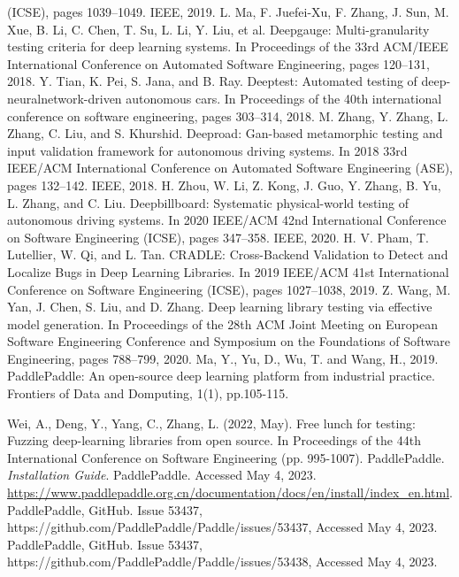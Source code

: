 \documentclass[sigconf]{acmart}
\begin{document}
\begin{thebibliography}{9}
(ICSE), pages 1039–1049. IEEE, 2019.
 L. Ma, F. Juefei-Xu, F. Zhang, J. Sun, M. Xue, B. Li, C. Chen, T. Su, L. Li, Y. Liu,
et al. Deepgauge: Multi-granularity testing criteria for deep learning systems. In
Proceedings of the 33rd ACM/IEEE International Conference on Automated Software
Engineering, pages 120–131, 2018.
 Y. Tian, K. Pei, S. Jana, and B. Ray. Deeptest: Automated testing of deep-neuralnetwork-driven autonomous cars. In Proceedings of the 40th international conference on software engineering, pages 303–314, 2018.
 M. Zhang, Y. Zhang, L. Zhang, C. Liu, and S. Khurshid. Deeproad: Gan-based
metamorphic testing and input validation framework for autonomous driving
systems. In 2018 33rd IEEE/ACM International Conference on Automated Software
Engineering (ASE), pages 132–142. IEEE, 2018.
 H. Zhou, W. Li, Z. Kong, J. Guo, Y. Zhang, B. Yu, L. Zhang, and C. Liu. Deepbillboard: Systematic physical-world testing of autonomous driving systems. In 2020
IEEE/ACM 42nd International Conference on Software Engineering (ICSE), pages
347–358. IEEE, 2020.
 H. V. Pham, T. Lutellier, W. Qi, and L. Tan. CRADLE: Cross-Backend Validation
to Detect and Localize Bugs in Deep Learning Libraries. In 2019 IEEE/ACM 41st
International Conference on Software Engineering (ICSE), pages 1027–1038, 2019.
 Z. Wang, M. Yan, J. Chen, S. Liu, and D. Zhang. Deep learning library testing
via effective model generation. In Proceedings of the 28th ACM Joint Meeting on
European Software Engineering Conference and Symposium on the Foundations of
Software Engineering, pages 788–799, 2020.
 Ma, Y., Yu, D., Wu, T. and Wang, H., 2019. PaddlePaddle: An open-source deep learning platform from industrial practice. Frontiers of Data and Domputing, 1(1), pp.105-115.

 Wei, A., Deng, Y., Yang, C.,  Zhang, L. (2022, May). Free lunch for testing: Fuzzing deep-learning libraries from open source. In Proceedings of the 44th International Conference on Software Engineering (pp. 995-1007).
 PaddlePaddle. \textit{Installation Guide}. PaddlePaddle. Accessed May 4, 2023. \url{https://www.paddlepaddle.org.cn/documentation/docs/en/install/index_en.html}.
 PaddlePaddle, GitHub. Issue 53437, https://github.com/PaddlePaddle/Paddle/issues/53437, Accessed May 4, 2023.
 PaddlePaddle, GitHub. Issue 53437, https://github.com/PaddlePaddle/Paddle/issues/53438, Accessed May 4, 2023.

\end{thebibliography}
\end{document}
